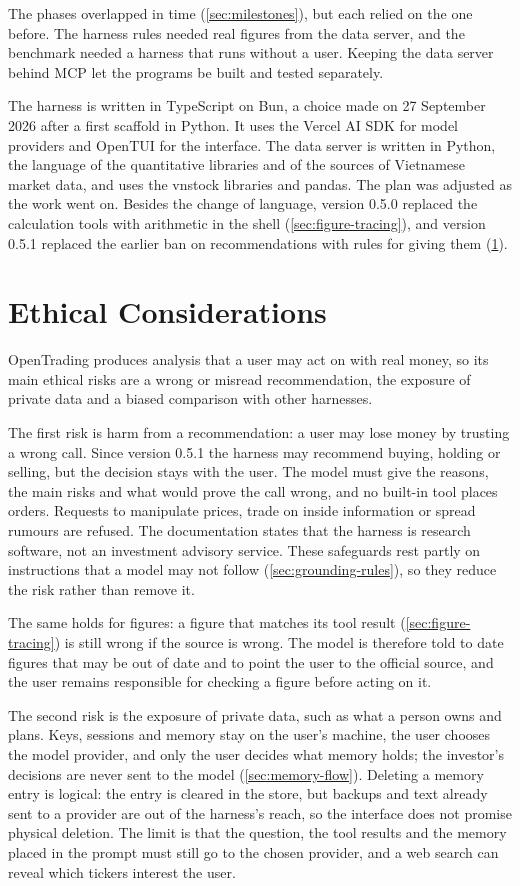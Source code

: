 The phases overlapped in time (\cref{sec:milestones}), but each relied on the one before.
The harness rules needed real figures from the data server, and the benchmark needed a harness that runs without a user.
Keeping the data server behind MCP let the programs be built and tested separately.

\label{sec:stack}
The harness is written in TypeScript on Bun, a choice made on 27 September 2026 after a first scaffold in Python.
It uses the Vercel AI SDK for model providers and OpenTUI for the interface.
The data server is written in Python, the language of the quantitative libraries and of the sources of Vietnamese market data, and uses the vnstock libraries and pandas.
The plan was adjusted as the work went on.
Besides the change of language, version 0.5.0 replaced the calculation tools with arithmetic in the shell (\cref{sec:figure-tracing}), and version 0.5.1 replaced the earlier ban on recommendations with rules for giving them (\cref{sec:ethics}).

\section{Ethical Considerations}\label{sec:ethics}
OpenTrading produces analysis that a user may act on with real money, so its main ethical risks are a wrong or misread recommendation, the exposure of private data and a biased comparison with other harnesses.

The first risk is harm from a recommendation: a user may lose money by trusting a wrong call.
Since version 0.5.1 the harness may recommend buying, holding or selling, but the decision stays with the user.
The model must give the reasons, the main risks and what would prove the call wrong, and no built-in tool places orders.
Requests to manipulate prices, trade on inside information or spread rumours are refused.
The documentation states that the harness is research software, not an investment advisory service.
These safeguards rest partly on instructions that a model may not follow (\cref{sec:grounding-rules}), so they reduce the risk rather than remove it.

The same holds for figures: a figure that matches its tool result (\cref{sec:figure-tracing}) is still wrong if the source is wrong.
The model is therefore told to date figures that may be out of date and to point the user to the official source, and the user remains responsible for checking a figure before acting on it.

The second risk is the exposure of private data, such as what a person owns and plans.
Keys, sessions and memory stay on the user's machine, the user chooses the model provider, and only the user decides what memory holds; the investor's decisions are never sent to the model (\cref{sec:memory-flow}).
Deleting a memory entry is logical: the entry is cleared in the store, but backups and text already sent to a provider are out of the harness's reach, so the interface does not promise physical deletion.
The limit is that the question, the tool results and the memory placed in the prompt must still go to the chosen provider, and a web search can reveal which tickers interest the user.

